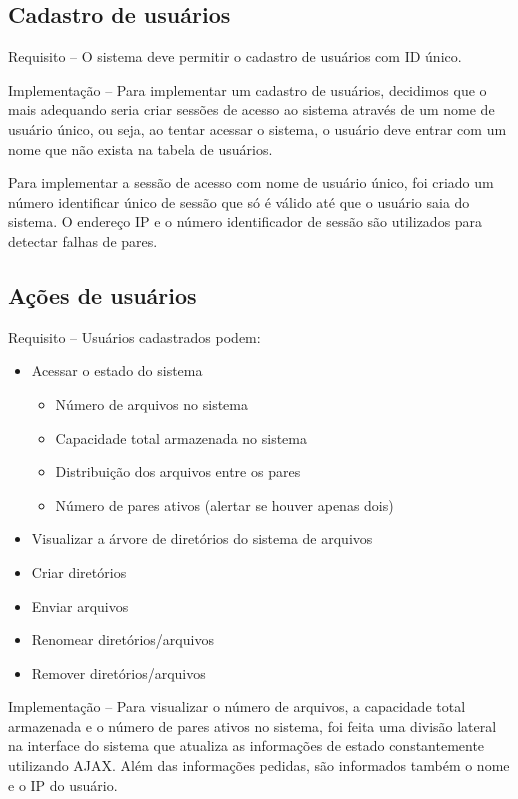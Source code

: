 \documentclass{article}
\begin{document}
\subsection{Cadastro de usuários}

\indent

Requisito -- O sistema deve permitir o cadastro de usuários com ID único.

Implementação -- Para implementar um cadastro de usuários, decidimos que o mais adequando seria criar sessões de acesso ao sistema através de um nome de usuário único, ou seja, ao tentar acessar o sistema, o usuário deve entrar com um nome que não exista na tabela de usuários.

Para implementar a sessão de acesso com nome de usuário único, foi criado um número identificar único de sessão que só é válido até que o usuário saia do sistema. O endereço IP e o número identificador de sessão são utilizados para detectar falhas de pares.

\subsection{Ações de usuários}

\indent

Requisito -- Usuários cadastrados podem:

\begin{itemize}
	\item Acessar o estado do sistema
	\begin{itemize}
		\item Número de arquivos no sistema
		\item Capacidade total armazenada no sistema
		\item Distribuição dos arquivos entre os pares
		\item Número de pares ativos (alertar se houver apenas dois)
	\end{itemize}
	\item Visualizar a árvore de diretórios do sistema de arquivos
	\item Criar diretórios
	\item Enviar arquivos
	\item Renomear diretórios/arquivos
	\item Remover diretórios/arquivos
\end{itemize}

Implementação -- Para visualizar o número de arquivos, a capacidade total armazenada e o número de pares ativos no sistema, foi feita uma divisão lateral na interface do sistema que atualiza as informações de estado constantemente utilizando AJAX. Além das informações pedidas, são informados também o nome e o IP do usuário.
\end{document}

